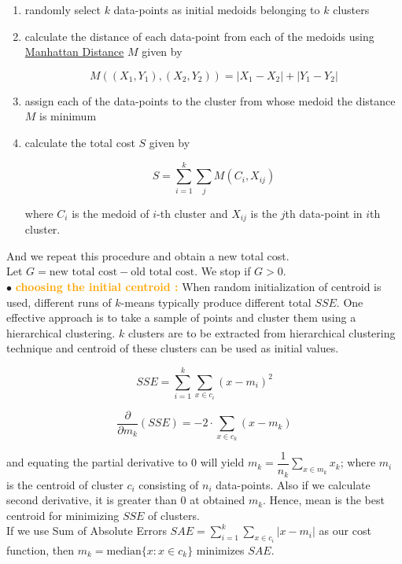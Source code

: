 \documentclass[11pt, a4paper]{article}
\begin{document}
\begin{enumerate}[(1)]
\item randomly select $k$ data-points as initial medoids belonging to $k$ clusters
\item calculate the distance of each data-point from each of the medoids using \underline{Manhattan Distance} $M$ given by

$$M((X_1, Y_1), (X_2, Y_2)) = |X_1 - X_2|+|Y_1 - Y_2|$$

\item assign each of the data-points to the cluster from whose medoid the distance $M$ is minimum
\item calculate the total cost $S$ given by

$$S = \sum\limits_{i = 1}^{k} \sum\limits_{j} M(C_i, X_{ij})$$

where $C_i$ is the medoid of $i$-th cluster and $X_{ij}$ is the $j$th data-point in $i$th cluster.

\end{enumerate}

And we repeat this procedure and obtain a new total cost. \\

Let $G = \text{new total cost} - \text{old total cost}$. We stop if $G > 0$. \\


$\bullet$ \textbf{\textcolor{orange}{choosing the initial centroid :}} When random initialization of centroid is used, different runs of $k$-means typically produce different total $SSE$. One effective approach is to take a sample of points and cluster them using a hierarchical clustering. $k$ clusters are to be extracted from hierarchical clustering technique and centroid of these clusters can be used as initial values.

$$SSE = \sum\limits_{i = 1}^{k} \sum\limits_{x \in c_i} (x - m_i)^2$$

$$\dfrac{\partial}{\partial m_k} (SSE) = -2 \cdot \sum\limits_{x \in c_k}(x - m_k)$$

and equating the partial derivative to $0$ will yield $m_k = \dfrac{1}{n_k}\sum\limits_{x \in m_k} x_k$; where $m_i$ is the centroid of cluster $c_i$ consisting of $n_i$ data-points. Also if we calculate second derivative, it is greater than 0 at obtained $m_k$. Hence, mean is the best centroid for minimizing $SSE$ of clusters. \\

If we use Sum of Absolute Errors $SAE = \sum\limits_{i = 1}^{k} \sum\limits_{x \in c_i} |x - m_i|$ as our cost function, then $m_k = \text{median}\{x : x \in c_k \}$ minimizes $SAE$. \\
\end{document}
